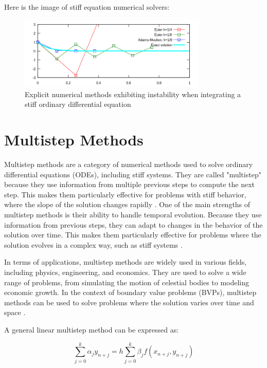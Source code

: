 \documentclass[a4paper, twoside]{report} %
\begin{document}
	Here is the image of stiff equation numerical solvers:

	\begin{figure}[htbp]
		\centering
		\includegraphics[width=0.8\textwidth]{chapters/2/StiffEquationNumericalSolvers.svg.png}
		\caption{Explicit numerical methods exhibiting instability when integrating a stiff ordinary differential equation}
		\label{fig:stiff_equation}
	\end{figure}




	\section{Multistep Methods}
	Multistep methods are a category of numerical methods used to solve ordinary differential equations (ODEs), including stiff systems. They are called "multistep" because they use information from multiple previous steps to compute the next step. This makes them particularly effective for problems with stiff behavior, where the slope of the solution changes rapidly \cite{math7121158}.
	One of the main strengths of multistep methods is their ability to handle temporal evolution. Because they use information from previous steps, they can adapt to changes in the behavior of the solution over time. This makes them particularly effective for problems where the solution evolves in a complex way, such as stiff systems \cite{math7121158}.

	In terms of applications, multistep methods are widely used in various fields, including physics, engineering, and economics. They are used to solve a wide range of problems, from simulating the motion of celestial bodies to modeling economic growth. In the context of boundary value problems (BVPs), multistep methods can be used to solve problems where the solution varies over time and space \cite{math7121158}.

	A general linear multistep method can be expressed as:

	\begin{equation}
		\sum_{j=0}^{k} \alpha_j y_{n+j} = h \sum_{j=0}^{k} \beta_j f(x_{n+j}, y_{n+j})
	\end{equation}
\end{document}
